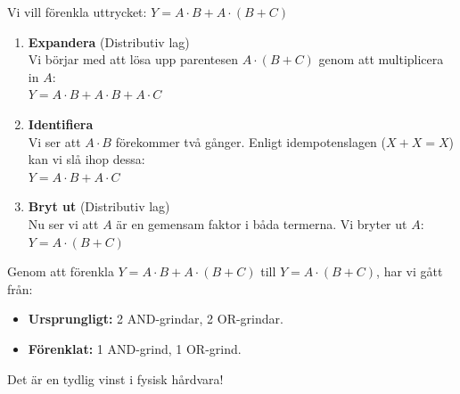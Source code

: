 \documentclass[
  swedish,
  letterpaper,
  oneside,
  openany]{book}
\providecommand{\tightlist}{%
  \setlength{\itemsep}{0pt}\setlength{\parskip}{0pt}}
\begin{document}
\begin{tcolorbox}[enhanced jigsaw, arc=.35mm, bottomrule=.15mm, bottomtitle=1mm, breakable, colback=white, colbacktitle=quarto-callout-note-color!10!white, colframe=quarto-callout-note-color-frame, coltitle=black, left=2mm, leftrule=.75mm, opacityback=0, opacitybacktitle=0.6, rightrule=.15mm, title=\textcolor{quarto-callout-note-color}{\faInfo}\hspace{0.5em}{Exempel: Förenkling av ett uttryck}, titlerule=0mm, toprule=.15mm, toptitle=1mm]

Vi vill förenkla uttrycket: \(Y = A \cdot B + A \cdot (B + C)\)

\begin{enumerate}
\def\labelenumi{\arabic{enumi}.}
\item
  \textbf{Expandera} (Distributiv lag)\\
  Vi börjar med att lösa upp parentesen \(A \cdot (B + C)\) genom att
  multiplicera in \(A\):\\
  \(Y = A \cdot B + A \cdot B + A \cdot C\)
\item
  \textbf{Identifiera}\\
  Vi ser att \(A \cdot B\) förekommer två gånger. Enligt idempotenslagen
  (\(X + X = X\)) kan vi slå ihop dessa:\\
  \(Y = A \cdot B + A \cdot C\)
\item
  \textbf{Bryt ut} (Distributiv lag)\\
  Nu ser vi att \(A\) är en gemensam faktor i båda termerna. Vi bryter
  ut \(A\):\\
  \(Y = A \cdot (B + C)\)
\end{enumerate}

Genom att förenkla \(Y = A \cdot B + A \cdot (B + C)\) till
\(Y = A \cdot (B + C)\), har vi gått från:

\begin{itemize}
\tightlist
\item
  \textbf{Ursprungligt:} 2 AND-grindar, 2 OR-grindar.
\item
  \textbf{Förenklat:} 1 AND-grind, 1 OR-grind.
\end{itemize}

Det är en tydlig vinst i fysisk hårdvara!

\end{tcolorbox}
\end{document}
